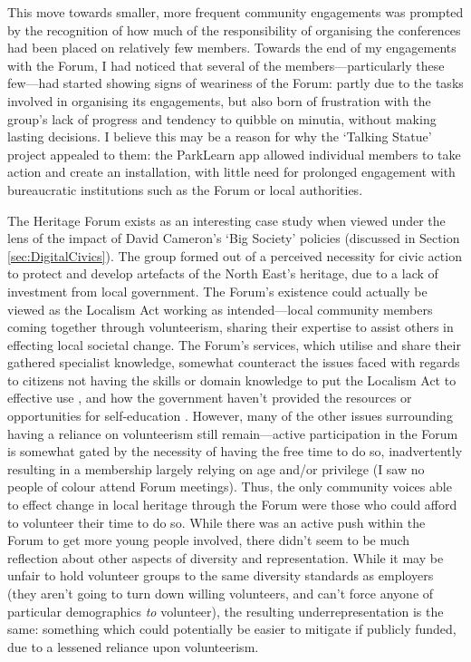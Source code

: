 This move towards smaller, more frequent community engagements was prompted by the recognition of how much of the  responsibility of organising the conferences had been placed on relatively few members. Towards the end of my engagements with the Forum, I had noticed that several of the members---particularly these few---had started showing signs of weariness of the Forum: partly due to the tasks involved in organising its engagements, but also born of frustration with the group's lack of progress and tendency to quibble on minutia, without making lasting decisions. I believe this may be a reason for why the `Talking Statue' project appealed to them: the ParkLearn app allowed individual members to take action and create an installation, with little need for prolonged engagement with bureaucratic institutions such as the Forum or local authorities.

The Heritage Forum exists as an interesting case study when viewed under the lens of the impact of David Cameron's `Big Society' policies (discussed in Section \ref{sec:DigitalCivics}). The group formed out of a perceived necessity for civic action to protect and develop artefacts of the North East's heritage, due to a lack of investment from local government. The Forum's existence could actually be viewed as the Localism Act working as intended---local community members coming together through volunteerism, sharing their expertise to assist others in effecting local societal change. The Forum's services, which utilise and share their gathered specialist knowledge, somewhat counteract the issues faced with regards to citizens not having the skills or domain knowledge to put the Localism Act to effective use \citep{BBCSundayPolitics2013}, and how the government haven't provided the resources or opportunities for self-education \citep{BenRogers2010a}. However, many of the other issues surrounding having a reliance on volunteerism still remain---active participation in the Forum is somewhat gated by the necessity of having the free time to do so, inadvertently resulting in a membership largely relying on age and/or privilege (I saw no people of colour attend Forum meetings). Thus, the only community voices able to effect change in local heritage through the Forum were those who could afford to volunteer their time to do so. While there was an active push within the Forum to get more young people involved, there didn't seem to be much reflection about other aspects of diversity and representation. While it may be unfair to hold volunteer groups to the same diversity standards as employers (they aren't going to turn down willing volunteers, and can't force anyone of particular demographics \textit{to} volunteer), the resulting underrepresentation is the same: something which could potentially be easier to mitigate if publicly funded, due to a lessened reliance upon volunteerism.

